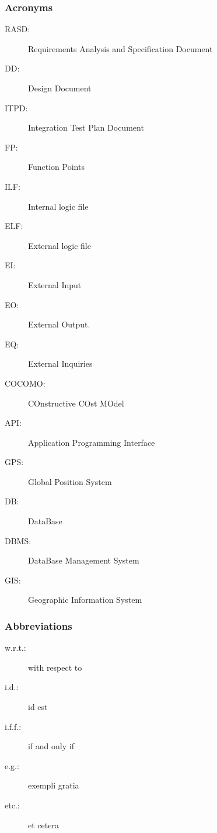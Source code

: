 \subsubsection{Acronyms}
	\begin{description}
		\item [RASD:] Requirements Analysis and Specification Document
		\item [DD:] Design Document
		\item [ITPD:] Integration Test Plan Document
		\item [FP:] Function Points
		\item [ILF:] Internal logic file
		\item [ELF:] External logic file
		\item [EI:] External Input
		\item [EO:] External Output.
		\item [EQ:] External Inquiries
		\item [COCOMO:] COnstructive COst MOdel
		\item [API:] Application Programming Interface
		\item [GPS:] Global Position System
		\item [DB:] DataBase
		\item [DBMS:] DataBase Management System
		\item [GIS:] Geographic Information System
	\end{description}
\subsubsection{Abbreviations}
	\begin{description}
		\item [w.r.t.:] with respect to
		\item [i.d.:] id est
		\item [i.f.f.:] if and only if
		\item [e.g.:] exempli gratia
		\item [etc.:] et cetera
	\end{description}

